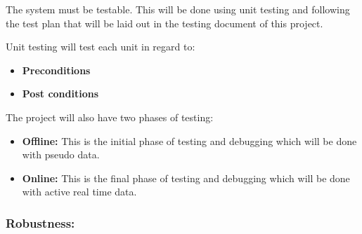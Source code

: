 \begin{flushleft}

The system must be testable. This will be done using unit testing and following the test plan that will be laid out in the testing document of this project.\\

\vspace{0.1in}

Unit testing will test each unit in regard to:
\begin{itemize}

\item\textbf{Preconditions}
\item\textbf{Post conditions}

\end{itemize}

The project will also have two phases of testing:

\begin{itemize}

\item\textbf{Offline:} This is the initial phase of testing and debugging which will be done with pseudo data.
\item\textbf{Online:} This is the final phase of testing and debugging which will be done with active real time data.

\end{itemize}

\end{flushleft}

\vspace{0.1in}





\vspace{0.1in}	



\vspace{0.2in}

\subsubsection{Robustness:}

